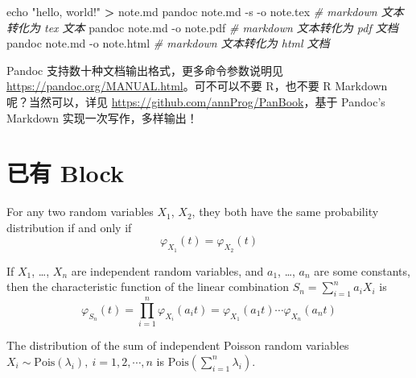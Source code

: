 \documentclass[
  lang=cn,
  11pt,
  scheme=chinese,
  chinesefont=nofont,
  bibstyle=apalike]{elegantbook}
\newenvironment{Shaded}{\begin{snugshade}}{\end{snugshade}}
\newcommand{\BuiltInTok}[1]{#1}
\newcommand{\CommentTok}[1]{\textcolor[rgb]{0.56,0.35,0.01}{\textit{#1}}}
\newcommand{\ExtensionTok}[1]{#1}
\newcommand{\NormalTok}[1]{#1}
\newcommand{\OperatorTok}[1]{\textcolor[rgb]{0.81,0.36,0.00}{\textbf{#1}}}
\newcommand{\StringTok}[1]{\textcolor[rgb]{0.31,0.60,0.02}{#1}}
\begin{document}
\begin{Shaded}
\begin{Highlighting}[]
\BuiltInTok{echo} \StringTok{"hello, world!"} \OperatorTok{\textgreater{}}\NormalTok{ note.md}
\ExtensionTok{pandoc}\NormalTok{ note.md {-}s {-}o note.tex }\CommentTok{\# markdown 文本转化为 tex 文本}
\ExtensionTok{pandoc}\NormalTok{ note.md {-}o note.pdf    }\CommentTok{\# markdown 文本转化为 pdf 文档}
\ExtensionTok{pandoc}\NormalTok{ note.md {-}o note.html   }\CommentTok{\# markdown 文本转化为 html 文档}
\end{Highlighting}
\end{Shaded}

Pandoc 支持数十种文档输出格式，更多命令参数说明见 \url{https://pandoc.org/MANUAL.html}。可不可以不要 R，也不要 R Markdown 呢？当然可以，详见 \url{https://github.com/annProg/PanBook}，基于 Pandoc's Markdown 实现一次写作，多样输出！

\hypertarget{theorem-block}{%
\section{已有 Block}\label{theorem-block}}

\begin{lemma}{}{}
\protect\hypertarget{lem:chf-pdf}{}{\label{lem:chf-pdf} }For any two random variables \(X_1\), \(X_2\), they both have the same probability distribution if and only if \[\varphi _{X_1}(t)=\varphi _{X_2}(t)\] \end{lemma}

\begin{theorem}{}{}
\protect\hypertarget{thm:chf-sum}{}{\label{thm:chf-sum} }If \(X_1\), \ldots, \(X_n\) are independent random variables, and \(a_1\), \ldots, \(a_n\) are some constants, then the characteristic function of the linear combination \(S_n=\sum_{i=1}^na_iX_i\) is \[\varphi _{S_{n}}(t)=\prod_{i=1}^n\varphi _{X_i}(a_{i}t)=\varphi _{X_{1}}(a_{1}t)\cdots \varphi _{X_{n}}(a_{n}t)\] \end{theorem}

\begin{proposition}{}{}
\protect\hypertarget{prp:unnamed-chunk-5}{}{\label{prp:unnamed-chunk-5} }The distribution of the sum of independent Poisson random variables \(X_i \sim \mathrm{Pois}(\lambda_i),\: i=1,2,\cdots,n\) is \(\mathrm{Pois}(\sum_{i=1}^n\lambda_i)\). \end{proposition}
\end{document}
